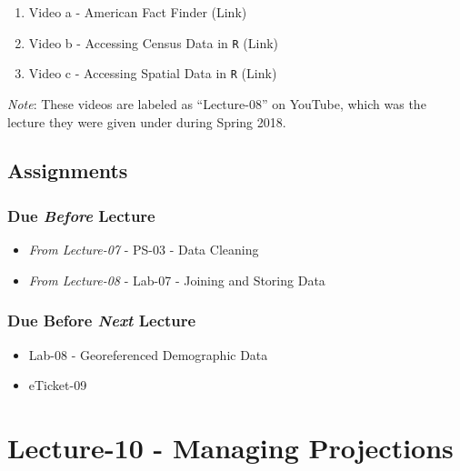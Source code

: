 \documentclass[]{book}
\providecommand{\tightlist}{%
  \setlength{\itemsep}{0pt}\setlength{\parskip}{0pt}}
\begin{document}
\begin{enumerate}
\def\labelenumi{\arabic{enumi}.}
\tightlist
\item
  Video a - American Fact Finder (Link)
\item
  Video b - Accessing Census Data in \texttt{R} (Link)
\item
  Video c - Accessing Spatial Data in \texttt{R} (Link)
\end{enumerate}

\emph{Note}: These videos are labeled as ``Lecture-08'' on YouTube, which was the lecture they were given under during Spring 2018.

\hypertarget{assignments-10}{%
\subsection*{Assignments}\label{assignments-10}}

\hypertarget{due-before-lecture-8}{%
\subsubsection*{\texorpdfstring{Due \emph{Before} Lecture}{Due Before Lecture}}\label{due-before-lecture-8}}

\begin{itemize}
\tightlist
\item
  \emph{From Lecture-07} - PS-03 - Data Cleaning
\item
  \emph{From Lecture-08} - Lab-07 - Joining and Storing Data
\end{itemize}

\hypertarget{due-before-next-lecture-7}{%
\subsubsection*{\texorpdfstring{Due Before \emph{Next} Lecture}{Due Before Next Lecture}}\label{due-before-next-lecture-7}}

\begin{itemize}
\tightlist
\item
  Lab-08 - Georeferenced Demographic Data
\item
  eTicket-09
\end{itemize}

\hypertarget{lecture-10---managing-projections}{%
\section*{Lecture-10 - Managing Projections}\label{lecture-10---managing-projections}}
\end{document}
